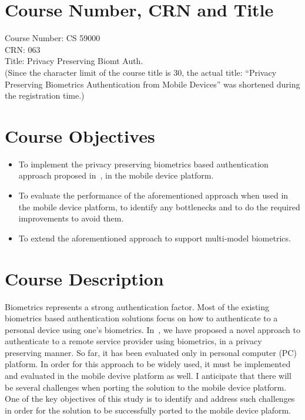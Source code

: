 \documentclass[a4paper,10pt]{article}
\begin{document}
\section{Course Number, CRN and Title}
Course Number: CS 59000\\
CRN: 063\\
Title: Privacy Preserving Biomt Auth.\\
(Since the character limit of the course title is 30, the actual title: ``Privacy Preserving Biometrics Authentication from Mobile Devices'' was shortened
during the registration time.)

\section{Course Objectives}
\begin{itemize}
 \item To implement the privacy preserving biometrics based authentication approach proposed in~\cite{ours}, in the mobile device platform.
 \item To evaluate the performance of the aforementioned approach when used in the mobile device platform, to identify any bottlenecks 
 and to do the required improvements to avoid them.
 \item To extend the aforementioned approach to support multi-model biometrics.
\end{itemize}


\section{Course Description}
Biometrics represents a strong authentication factor. Most of the existing biometrics based authentication solutions focus on how to authenticate
to a personal device using one's biometrics. In~\cite{ours}, we have proposed a novel approach to authenticate to a remote service provider using
biometrics, in a privacy preserving manner. So far, it has been evaluated only in personal computer (PC) platform. In order for this approach to 
be widely used, it must be implemented and evaluated in the mobile devive platform as well. I anticipate that there will be several challenges when porting the solution to the mobile device platform. 
One of the key objectives of this study is to identify and address such challenges in order for the solution to be successfully ported to the
mobile device plaform.
\end{document}
